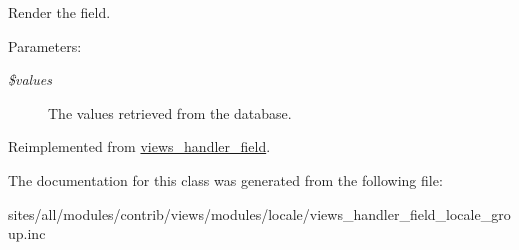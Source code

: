 Render the field.

\begin{Desc}
\item[Parameters:]
\begin{description}
\item[{\em \$values}]The values retrieved from the database. \end{description}
\end{Desc}


Reimplemented from \hyperlink{classviews__handler__field_82ff951c5e9ceb97b2eab86f880cbc1e}{views\_\-handler\_\-field}.

The documentation for this class was generated from the following file:\begin{CompactItemize}
\item 
sites/all/modules/contrib/views/modules/locale/views\_\-handler\_\-field\_\-locale\_\-group.inc\end{CompactItemize}
